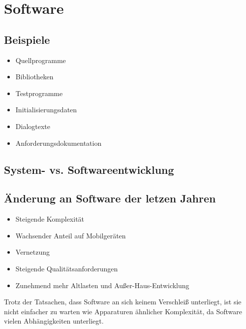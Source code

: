 \section{Software}

\subsection{Beispiele}
\begin{itemize}
    \item Quellprogramme
    \item Bibliotheken
    \item Testprogramme
    \item Initialisierungsdaten
    \item Dialogtexte
    \item Anforderungsdokumentation
\end{itemize}

\subsection{System- vs. Softwareentwicklung}


\subsection{Änderung an Software der letzen Jahren}
\begin{itemize}
    \item Steigende Komplexität 
    \item Wachsender Anteil auf Mobilgeräten
    \item Vernetzung
    \item Steigende Qualitätsanforderungen
    \item Zunehmend mehr Altlasten und Außer-Haus-Entwicklung
\end{itemize}
Trotz der Tatsachen, dass Software an sich keinem Verschleiß unterliegt, ist sie nicht einfacher zu warten wie Apparaturen ähnlicher Komplexität, da Software vielen Abhängigkeiten unterliegt.